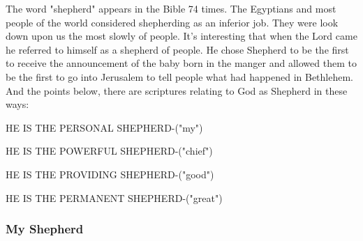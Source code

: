 The word "shepherd" appears in the Bible 74 times. The Egyptians and most people of the world considered shepherding as an inferior job. They were look down upon us the most slowly of people. It's interesting that when the Lord came he referred to himself as a shepherd of people. He chose Shepherd to be the first to receive the announcement of the baby born in the manger and allowed them to be the first to go into Jerusalem to tell people what had happened in Bethlehem. And the points below, there are scriptures relating to God as Shepherd in these ways:\\
\begin{compactenum}[I.]
    \item HE IS THE PERSONAL SHEPHERD-("my")
    \item HE IS THE POWERFUL SHEPHERD-("chief")
    \item HE IS THE PROVIDING SHEPHERD-("good")
    \item HE IS THE PERMANENT SHEPHERD-("great")\\
\end{compactenum}



\subsubsection{My Shepherd}

